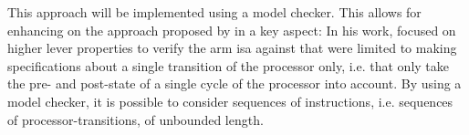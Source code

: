 This approach will be implemented using a model checker.
This allows for enhancing on the approach proposed by \citeauthor{Reid17} \cite{Reid17} in a key aspect:
In his work, \citeauthor{Reid17} focused on higher lever properties to verify the \gls{arm} \gls{isa} against that were limited to making specifications about a single transition of the processor only, i.e. that only take the pre- and post-state of a single cycle of the processor into account.
By using a model checker, it is possible to consider sequences of instructions, i.e. sequences of processor-transitions, of unbounded length.

